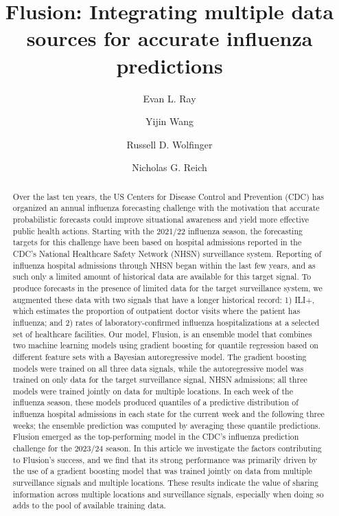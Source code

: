 \documentclass{article}\usepackage[]{graphicx}\usepackage[]{xcolor}
\title{Flusion: Integrating multiple data sources for accurate influenza predictions}
\author[1]{Evan L. Ray}
\author[1]{Yijin Wang}
\author[2]{Russell D. Wolfinger}
\author[1]{Nicholas G. Reich}
\affil[1]{Department of Biostatistics and Epidemiology, University of Massachusetts, Amherst, MA, United States}
\affil[2]{JMP Statistical Discovery, Cary, NC, United States}
\date{}
\begin{document}
\maketitle





\begin{abstract}
Over the last ten years, the US Centers for Disease Control and Prevention (CDC) has organized an annual influenza forecasting challenge with the motivation that accurate probabilistic forecasts could improve situational awareness and yield more effective public health actions.
Starting with the 2021/22 influenza season, the forecasting targets for this challenge have been based on hospital admissions reported in the CDC’s National Healthcare Safety Network (NHSN) surveillance system.
Reporting of influenza hospital admissions through NHSN began within the last few years, and as such only a limited amount of historical data are available for this target signal.
To produce forecasts in the presence of limited data for the target surveillance system, we augmented these data with two signals that have a longer historical record: 1) ILI+, which estimates the proportion of outpatient doctor visits where the patient has influenza; and 2) rates of laboratory-confirmed influenza hospitalizations at a selected set of healthcare facilities.
Our model, Flusion, is an ensemble model that combines two machine learning models using gradient boosting for quantile regression based on different feature sets with a Bayesian autoregressive model.
The gradient boosting models were trained on all three data signals, while the autoregressive model was trained on only data for the target surveillance signal, NHSN admissions; all three models were trained jointly on data for multiple locations.
In each week of the influenza season, these models produced quantiles of a predictive distribution of influenza hospital admissions in each state for the current week and the following three weeks; the ensemble prediction was computed by averaging these quantile predictions.
Flusion emerged as the top-performing model in the CDC's influenza prediction challenge for the 2023/24 season.
In this article we investigate the factors contributing to Flusion's success, and we find that its strong performance was primarily driven by the use of a gradient boosting model that was trained jointly on data from multiple surveillance signals and multiple locations.
These results indicate the value of sharing information across multiple locations and surveillance signals, especially when doing so adds to the pool of available training data.
\end{abstract}
\end{document}
